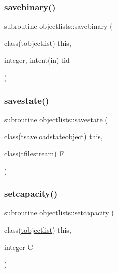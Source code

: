 \mbox{\label{namespaceobjectlists_abbc4a249efcc68f87936eb7e93ecffaf}} 
\subsubsection{\texorpdfstring{savebinary()}{savebinary()}}
{\footnotesize\ttfamily subroutine objectlists\+::savebinary (\begin{DoxyParamCaption}\item[{class(\mbox{\hyperlink{structobjectlists_1_1tobjectlist}{tobjectlist}})}]{this,  }\item[{integer, intent(in)}]{fid }\end{DoxyParamCaption})\hspace{0.3cm}{\ttfamily [private]}}

\mbox{\label{namespaceobjectlists_a0524c4d9e51cce87cd2864352d116374}} 
\subsubsection{\texorpdfstring{savestate()}{savestate()}}
{\footnotesize\ttfamily subroutine objectlists\+::savestate (\begin{DoxyParamCaption}\item[{class(\mbox{\hyperlink{structobjectlists_1_1tsaveloadstateobject}{tsaveloadstateobject}})}]{this,  }\item[{class(tfilestream)}]{F }\end{DoxyParamCaption})\hspace{0.3cm}{\ttfamily [private]}}

\mbox{\label{namespaceobjectlists_a3f4c3dd9be50ae77b46cec13a3345fad}} 
\subsubsection{\texorpdfstring{setcapacity()}{setcapacity()}}
{\footnotesize\ttfamily subroutine objectlists\+::setcapacity (\begin{DoxyParamCaption}\item[{class(\mbox{\hyperlink{structobjectlists_1_1tobjectlist}{tobjectlist}})}]{this,  }\item[{integer}]{C }\end{DoxyParamCaption})\hspace{0.3cm}{\ttfamily [private]}}

